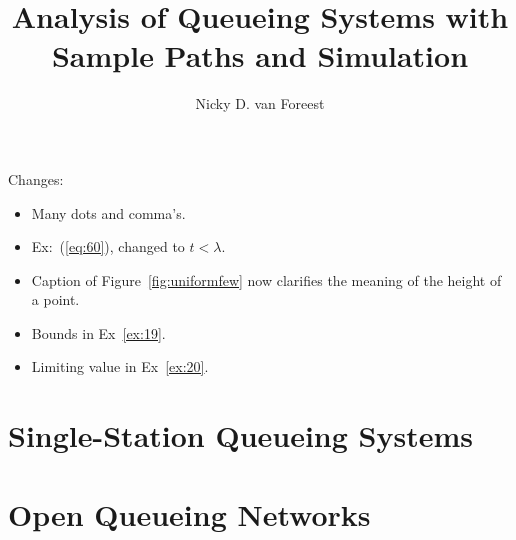 \author{Nicky D. van  Foreest}
\title{Analysis of Queueing Systems with  Sample Paths and Simulation }


\maketitle

Changes:
\begin{itemize}
\item Many dots and comma's. 
\item Ex:~(\ref{eq:60}), changed to $t<\lambda$. 
\item Caption of Figure~\ref{fig:uniformfew} now clarifies the meaning of the height of a point. 
\item Bounds in Ex~\ref{ex:19}.
\item Limiting value in Ex~\ref{ex:20}. 
\end{itemize}

\tableofcontents




\chapter{Single-Station Queueing Systems}
\label{cha:single-stat-queu}



















%
 



%


\chapter{Open Queueing Networks}
\label{sec:notes-relat-chapt2}




%


